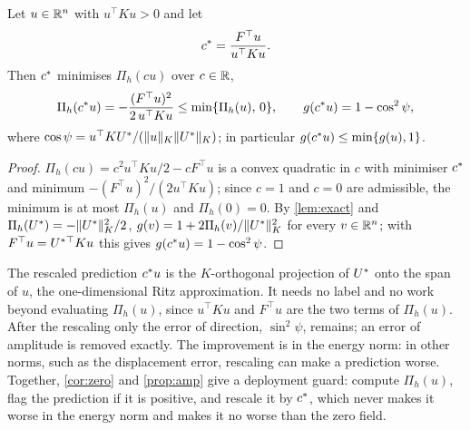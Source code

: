 \begin{proposition}\label{prop:amp}
Let $u\in\mathbb{R}^{n}$ with $u^{\top}Ku>0$ and let
\begin{equation}
c^{\ast} = \frac{F^{\top}u}{u^{\top}Ku}.
\label{eq:cstar}
\end{equation}
Then $c^{\ast}$ minimises $\Pi_h(cu)$ over $c\in\mathbb{R}$,
\begin{equation}
\Pi_h(c^{\ast} u) = -\frac{(F^{\top}u)^{2}}{2\,u^{\top}Ku} \le \min\{\Pi_h(u),\,0\},
\qquad
g(c^{\ast} u) = 1-\cos^{2}\psi ,
\label{eq:amp}
\end{equation}
where $\cos\psi=u^{\top}KU^{\ast}/(\lVert u\rVert_K\lVert U^{\ast}\rVert_K)$; in particular
$g(c^{\ast} u)\le\min\{g(u),1\}$.
\end{proposition}

\begin{proof}
$\Pi_h(cu)=c^2u^{\top}Ku/2-cF^{\top}u$ is a convex quadratic in $c$ with minimiser
$c^{\ast}$ and minimum $-(F^{\top}u)^2/(2u^{\top}Ku)$; since $c=1$ and $c=0$ are admissible,
the minimum is at most $\Pi_h(u)$ and $\Pi_h(0)=0$. By \cref{lem:exact} and
$\Pi_h(U^{\ast})=-\lVert U^{\ast}\rVert_K^2/2$, $g(v)=1+2\Pi_h(v)/\lVert U^{\ast}\rVert_K^2$ for every
$v\in\mathbb{R}^{n}$; with $F^{\top}u=U^{\ast}{}^{\top}Ku$ this gives $g(c^{\ast} u)=1-\cos^2\psi$.
\end{proof}

The rescaled prediction $c^{\ast} u$ is the $K$-orthogonal projection of $U^{\ast}$ onto the
span of $u$, the one-dimensional Ritz approximation. It needs no label and no work beyond
evaluating $\Pi_h(u)$, since $u^{\top}Ku$ and $F^{\top}u$ are the two terms of $\Pi_h(u)$.
After the rescaling only the error of direction, $\sin^2\psi$, remains; an error of
amplitude is removed exactly. The improvement is in the energy norm: in other norms,
such as the displacement error, rescaling can make a prediction worse. Together,
\cref{cor:zero} and \cref{prop:amp} give a deployment guard: compute $\Pi_h(u)$, flag the
prediction if it is positive, and rescale it by $c^{\ast}$, which never makes it worse in the
energy norm and makes it no worse than the zero field.
